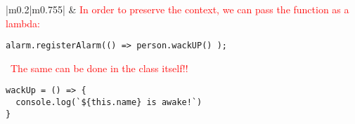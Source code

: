 \documentclass[main.tex,fontsize=8pt,paper=a4,paper=portrait,DIV=calc,]{scrartcl}
\begin{document}
\pagebreak
\begin{table}[ht!]
\begin{tabular}{|m{0.2\linewidth}|m{0.755\linewidth}|}
\hline
&
\textcolor{red}{In order to preserve the context, we can pass the function as a lambda:}\newline
\begin{lstlisting}
alarm.registerAlarm(() => person.wackUP() );
\end{lstlisting} 
\, \newline
\textcolor{red}{The same can be done in the class itself!!}\newline
\begin{lstlisting}
wackUp = () => {
  console.log(`${this.name} is awake!`)
}
\end{lstlisting}\\
\hline
\end{tabular}

\end{table}
\end{document}
